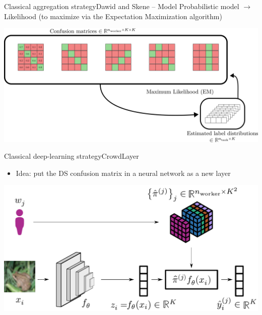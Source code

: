 \begin{frame}{Classical aggregation strategy}{Dawid and Skene -- Model}
Probabilistic model $\longrightarrow$ Likelihood (to maximize via the Expectation Maximization algorithm)
\begin{center}
\includegraphics[width=.75\textwidth]{./images/DS_EM.pdf}
\end{center}
\end{frame}

\begin{frame}{Classical deep-learning strategy}{CrowdLayer}
    \begin{itemize}
        \item Idea: put the DS confusion matrix in a neural network as a new layer
    \end{itemize}

    \begin{center}
        \includegraphics[width=\textwidth]{./images/crowdlayer_scheme.pdf}
    \end{center}
\end{frame}

